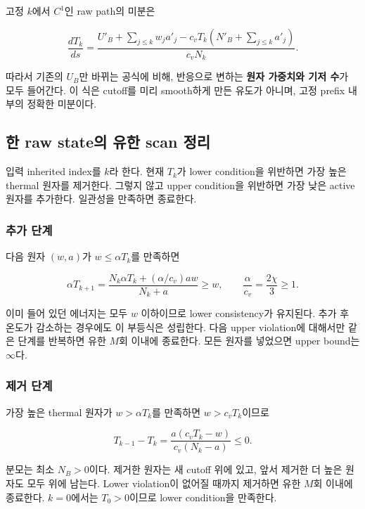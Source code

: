\documentclass[11pt,a4paper]{article}
\begin{document}
고정 \(k\)에서 \(C^1\)인 raw path의 미분은

\[\frac{dT_k}{ds}=\frac{U'_B+\sum_{j\le k}w_ja'_j-c_vT_k(N'_B+\sum_{j\le k}a'_j)}{c_vN_k}.\tag{RB.4}\]

따라서 기존의 \(U_B\)만 바뀌는 공식에 비해, 반응으로 변하는 \textbf{원자 가중치와 기저 수}가 모두 들어간다. 이 식은 cutoff를 미리 smooth하게 만든 유도가 아니며, 고정 prefix 내부의 정확한 미분이다.

\hypertarget{uxd55c-raw-stateuxc758-uxc720uxd55c-scan-uxc815uxb9ac}{%
\subsection{한 raw state의 유한 scan 정리}\label{uxd55c-raw-stateuxc758-uxc720uxd55c-scan-uxc815uxb9ac}}

입력 inherited index를 \(k\)라 한다. 현재 \(T_k\)가 lower condition을 위반하면 가장 높은 thermal 원자를 제거한다. 그렇지 않고 upper condition을 위반하면 가장 낮은 active 원자를 추가한다. 일관성을 만족하면 종료한다.

\hypertarget{uxcd94uxac00-uxb2e8uxacc4}{%
\subsubsection{추가 단계}\label{uxcd94uxac00-uxb2e8uxacc4}}

다음 원자 \((w,a)\)가 \(w\le\alpha T_k\)를 만족하면

\[\alpha T_{k+1}=\frac{N_k\alpha T_k+(\alpha/c_v)aw}{N_k+a}\ge w,\qquad\frac\alpha{c_v}=\frac{2\chi}3\ge1.\tag{RB.5}\]

이미 들어 있던 에너지는 모두 \(w\) 이하이므로 lower consistency가 유지된다. 추가 후 온도가 감소하는 경우에도 이 부등식은 성립한다. 다음 upper violation에 대해서만 같은 단계를 반복하면 유한 \(M\)회 이내에 종료한다. 모든 원자를 넣었으면 upper bound는 \(\infty\)다.

\hypertarget{uxc81cuxac70-uxb2e8uxacc4}{%
\subsubsection{제거 단계}\label{uxc81cuxac70-uxb2e8uxacc4}}

가장 높은 thermal 원자가 \(w>\alpha T_k\)를 만족하면 \(w>c_vT_k\)이므로

\[T_{k-1}-T_k=\frac{a(c_vT_k-w)}{c_v(N_k-a)}\le0.\tag{RB.6}\]

분모는 최소 \(N_B>0\)이다. 제거한 원자는 새 cutoff 위에 있고, 앞서 제거한 더 높은 원자도 모두 위에 남는다. Lower violation이 없어질 때까지 제거하면 유한 \(M\)회 이내에 종료한다. \(k=0\)에서는 \(T_0>0\)이므로 lower condition을 만족한다.
\end{document}
